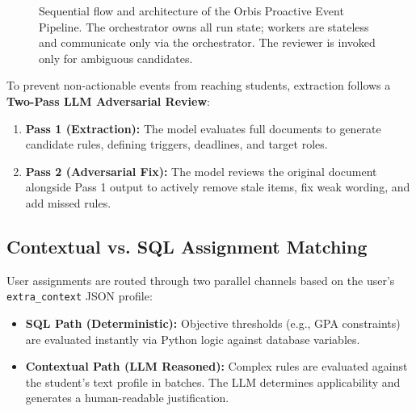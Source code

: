 \documentclass[a4paper,12pt]{article}
\begin{document}
\begin{figure}[H]
{}
    \caption{Sequential flow and architecture of the Orbis Proactive Event Pipeline. The orchestrator owns all run state; workers are stateless and communicate only via the orchestrator. The reviewer is invoked only for ambiguous candidates.}
    \label{fig:event_system_architecture}
\end{figure}

To prevent non-actionable events from reaching students, extraction follows a \textbf{Two-Pass LLM Adversarial Review}:
\begin{enumerate}
    \item \textbf{Pass 1 (Extraction):} The model evaluates full documents to generate candidate rules, defining triggers, deadlines, and target roles.
    \item \textbf{Pass 2 (Adversarial Fix):} The model reviews the original document alongside Pass 1 output to actively remove stale items, fix weak wording, and add missed rules.
\end{enumerate}

\subsection{Contextual vs. SQL Assignment Matching}
User assignments are routed through two parallel channels based on the user's \texttt{extra\_context} JSON profile:
\begin{itemize}
    \item \textbf{SQL Path (Deterministic):} Objective thresholds (e.g., GPA constraints) are evaluated instantly via Python logic against database variables.
    \item \textbf{Contextual Path (LLM Reasoned):} Complex rules are evaluated against the student's text profile in batches. The LLM determines applicability and generates a human-readable justification.
\end{itemize}
\end{document}
